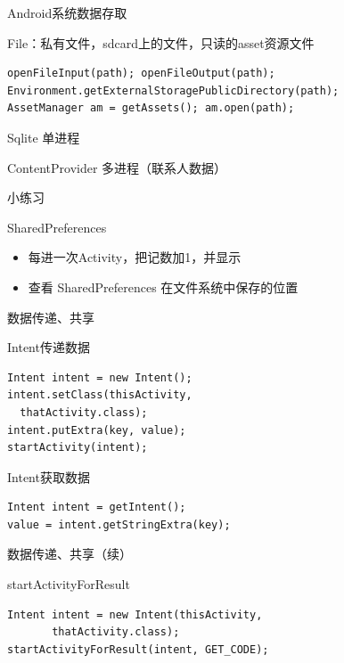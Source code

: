 \documentclass[presentation,dvipdfmx,CJKbookmarks]{beamer}
\begin{document}
\begin{CJK*}{UTF8}{simsun}
\begin{enumerate}
\begin{frame}[fragile,label={sec:org1602a59}]{Android系统数据存取}
\begin{block}{File：私有文件，sdcard上的文件，只读的asset资源文件}
\begin{verbatim}
openFileInput(path); openFileOutput(path);
Environment.getExternalStoragePublicDirectory(path);
AssetManager am = getAssets(); am.open(path);
\end{verbatim}
\end{block}
\begin{block}{Sqlite 单进程}
\end{block}
\begin{block}{ContentProvider 多进程（联系人数据）}
\end{block}
\end{frame}
\begin{frame}[label={sec:orgf6a757f}]{小练习}
\begin{block}{SharedPreferences}
\begin{itemize}
\item 每进一次Activity，把记数加1，并显示
\item 查看 SharedPreferences 在文件系统中保存的位置
\end{itemize}
\end{block}
\end{frame}

\begin{frame}[fragile,label={sec:org85247b5}]{数据传递、共享}
 \begin{block}{Intent传递数据}
\begin{verbatim}
Intent intent = new Intent();
intent.setClass(thisActivity,
  thatActivity.class);
intent.putExtra(key, value);
startActivity(intent);
\end{verbatim}
\end{block}

\begin{block}{Intent获取数据}
\begin{verbatim}
Intent intent = getIntent();
value = intent.getStringExtra(key);
\end{verbatim}
\end{block}
\end{frame}
\begin{frame}[fragile,label={sec:orgc8b4406}]{数据传递、共享（续）}
 \begin{block}{startActivityForResult}
\begin{verbatim}
Intent intent = new Intent(thisActivity,
       thatActivity.class);
startActivityForResult(intent, GET_CODE);


\end{verbatim}
\end{block}
\end{frame}
\end{enumerate}
\end{CJK*}
\end{document}
